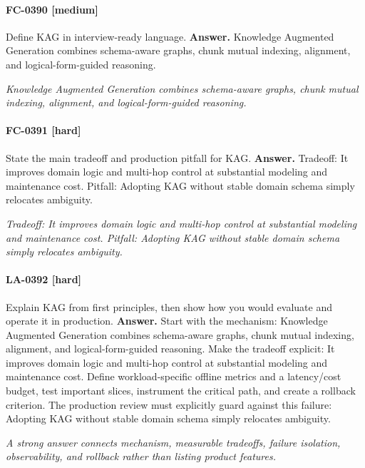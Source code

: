 \paragraph{FC-0390 [medium]} Define KAG in interview-ready language.
\noindent\textbf{Answer.} Knowledge Augmented Generation combines schema-aware graphs, chunk mutual indexing, alignment, and logical-form-guided reasoning.
\par\textit{Knowledge Augmented Generation combines schema-aware graphs, chunk mutual indexing, alignment, and logical-form-guided reasoning.}
\paragraph{FC-0391 [hard]} State the main tradeoff and production pitfall for KAG.
\noindent\textbf{Answer.} Tradeoff: It improves domain logic and multi-hop control at substantial modeling and maintenance cost. Pitfall: Adopting KAG without stable domain schema simply relocates ambiguity.
\par\textit{Tradeoff: It improves domain logic and multi-hop control at substantial modeling and maintenance cost. Pitfall: Adopting KAG without stable domain schema simply relocates ambiguity.}
\paragraph{LA-0392 [hard]} Explain KAG from first principles, then show how you would evaluate and operate it in production.
\noindent\textbf{Answer.} Start with the mechanism: Knowledge Augmented Generation combines schema-aware graphs, chunk mutual indexing, alignment, and logical-form-guided reasoning. Make the tradeoff explicit: It improves domain logic and multi-hop control at substantial modeling and maintenance cost. Define workload-specific offline metrics and a latency/cost budget, test important slices, instrument the critical path, and create a rollback criterion. The production review must explicitly guard against this failure: Adopting KAG without stable domain schema simply relocates ambiguity.
\par\textit{A strong answer connects mechanism, measurable tradeoffs, failure isolation, observability, and rollback rather than listing product features.}
